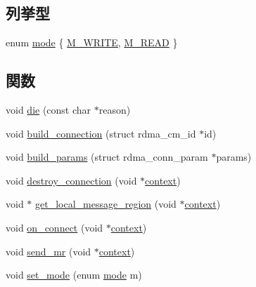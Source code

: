 \subsection*{列挙型}
\begin{DoxyCompactItemize}
\item 
enum \hyperlink{rdma-common_8h_a1a6b6fb557d8d37d59700faf4e4c9167}{mode} \{ \hyperlink{rdma-common_8h_a1a6b6fb557d8d37d59700faf4e4c9167a7af369c035a45a9babde5a9443b5ef01}{M\_\-WRITE}, 
\hyperlink{rdma-common_8h_a1a6b6fb557d8d37d59700faf4e4c9167a0cb0be5475011ea9319ce55b30e74634}{M\_\-READ}
 \}
\end{DoxyCompactItemize}
\subsection*{関数}
\begin{DoxyCompactItemize}
\item 
void \hyperlink{rdma-common_8h_aac69fbddfabaad6d61082ad9e6f94505}{die} (const char $\ast$reason)
\item 
void \hyperlink{rdma-common_8h_a57b367ce7e3ae058aa4e2ad739e13ec2}{build\_\-connection} (struct rdma\_\-cm\_\-id $\ast$id)
\item 
void \hyperlink{rdma-common_8h_a1fa64af8a437eea7c184fbae1713e7cb}{build\_\-params} (struct rdma\_\-conn\_\-param $\ast$params)
\item 
void \hyperlink{rdma-common_8h_a54feeefad62ea6509ced24a1a06a7a6e}{destroy\_\-connection} (void $\ast$\hyperlink{structcontext}{context})
\item 
void $\ast$ \hyperlink{rdma-common_8h_a0162804c064e82d210197b0163278f39}{get\_\-local\_\-message\_\-region} (void $\ast$\hyperlink{structcontext}{context})
\item 
void \hyperlink{rdma-common_8h_a302021034f42b123904f59dad3990962}{on\_\-connect} (void $\ast$\hyperlink{structcontext}{context})
\item 
void \hyperlink{rdma-common_8h_aa7bbf375e749e0c78b50ff21ad9013f7}{send\_\-mr} (void $\ast$\hyperlink{structcontext}{context})
\item 
void \hyperlink{rdma-common_8h_abe5494f2e0e27dd073dafa13b2f89f5e}{set\_\-mode} (enum \hyperlink{rdma-common_8h_a1a6b6fb557d8d37d59700faf4e4c9167}{mode} m)
\end{DoxyCompactItemize}


